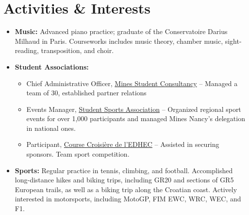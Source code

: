 \documentclass[a4paper,9pt]{extarticle}
\begin{document}
\vspace{7pt}

\section*{\faHeart \hspace{0.1em} Activities \& Interests}
\begin{itemize}
\item \textbf{Music:} Advanced piano practice; graduate of the Conservatoire Darius Milhaud in Paris. Courseworks includes music theory, chamber music, sight-reading, transposition, and choir.
\item \textbf{Student Associations:}
\begin{itemize}
\item Chief Administrative Officer, \href{https://mines-services.fr/}{Mines Student Consultancy} -- Managed a team of 30, established partner relations
\item Events Manager, \href{https://www.bdeminesnancy.com/bds}{Student Sports Association} -- Organized regional sport events for over 1,000 participants and managed Mines Nancy's delegation in national ones.
\item Participant, \href{https://cce.fr/}{Course Croisière de l’EDHEC} -- Assisted in securing sponsors. Team sport competition.
\end{itemize}
\item \textbf{Sports:} Regular practice in tennis, climbing, and football. Accomplished long-distance hikes and biking trips, including GR20 and sections of GR5 European trails, as well as a biking trip along the Croatian coast. Actively interested in motorsports, including MotoGP, FIM EWC, WRC, WEC, and F1.
\end{itemize}
\end{document}
